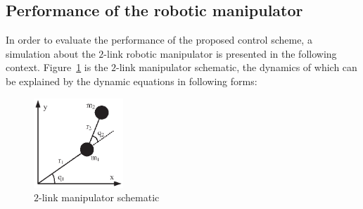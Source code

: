 \documentclass[3p]{elsarticle}
\theoremstyle{plain}
\theoremstyle{remark}
\begin{document}
\subsection{Performance of the robotic manipulator}\label{sec:robotica manipulator}
In order to evaluate the performance of the proposed control scheme, a simulation about the $2$-link robotic manipulator is presented in the following context. Figure~\ref{Figure:1} is the $2$-link manipulator schematic, the dynamics of which can be explained by the dynamic equations in following forms:
\begin{figure}[http]
\centering
\includegraphics[width=0.3\textwidth]{paper3_fig1.eps}
\caption{$2$-link manipulator schematic}
\label{Figure:1}
\end{figure}
\end{document}

